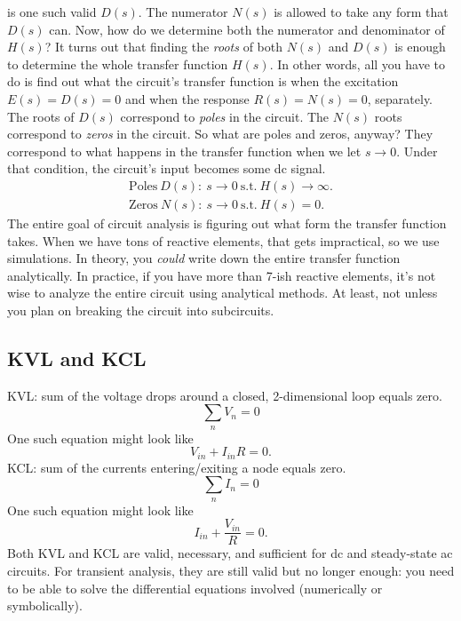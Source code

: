 is one such valid $D(s)$. The numerator $N(s)$ is allowed to take any form that $D(s)$ can. Now, how do we determine both the numerator and denominator of $H(s)$? It turns out that finding the \textit{roots} of both $N(s)$ and $D(s)$ is enough to determine the whole transfer function $H(s)$. In other words, all you have to do is find out what the circuit's transfer function is when the excitation $E(s) = D(s) = 0$ and when the response $R(s) = N(s) = 0$, separately. The roots of $D(s)$ correspond to \textit{poles} in the circuit. The $N(s)$ roots correspond to \textit{zeros} in the circuit. So what are poles and zeros, anyway? They correspond to what happens in the transfer function when we let $s \rightarrow 0$. Under that condition, the circuit's input becomes some dc signal.
\begin{align}
\label{eq:22}
 \text{Poles}\ D(s) \colon \ s \rightarrow 0 \  \text{s.t.} \  H(s) \rightarrow \infty. \\
\text{Zeros}\ N(s) \colon \ s \rightarrow 0 \  \text{s.t.} \  H(s) = 0.
\end{align}
The entire goal of circuit analysis is figuring out what form the transfer function takes. When we have tons of reactive elements, that gets impractical, so we use simulations. In theory, you \textit{could} write down the entire transfer function analytically. In practice, if you have more than 7-ish reactive elements, it's not wise to analyze the entire circuit using analytical methods. At least, not unless you plan on breaking the circuit into subcircuits.

\subsection{KVL and KCL}
KVL: sum of the voltage drops around a closed, 2-dimensional loop equals zero.
\begin{equation}
\label{eq:24}
\sum_{n} V_{n} = 0
\end{equation}
One such equation might look like
\begin{equation}
\label{eq:25}
V_{in} + I_{in} R = 0.
\end{equation}
KCL: sum of the currents entering/exiting a node equals zero.
\begin{equation}
\label{eq:26}
\sum_{n} I_{n} = 0
\end{equation}
One such equation might look like
\begin{equation}
\label{eq:27}
I_{in} + \frac{V_{in}}{R} = 0.
\end{equation}
Both KVL and KCL are valid, necessary, and sufficient for dc and steady-state ac circuits. For transient analysis, they are still valid but no longer enough: you need to be able to solve the differential equations involved (numerically or symbolically).
